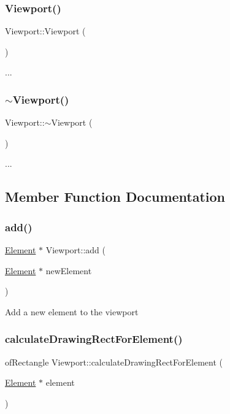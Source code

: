 \subsubsection{\texorpdfstring{Viewport()}{Viewport()}}
{\footnotesize\ttfamily Viewport\+::\+Viewport (\begin{DoxyParamCaption}{ }\end{DoxyParamCaption})}

... \mbox{\label{class_viewport_a1e18a1ff4a52be33ef63d25034561850}} 
\subsubsection{\texorpdfstring{$\sim$\+Viewport()}{~Viewport()}}
{\footnotesize\ttfamily Viewport\+::$\sim$\+Viewport (\begin{DoxyParamCaption}{ }\end{DoxyParamCaption})}

... 

\subsection{Member Function Documentation}
\mbox{\label{class_viewport_a91661e99e68106bb29cf20807c5a167c}} 
\subsubsection{\texorpdfstring{add()}{add()}}
{\footnotesize\ttfamily \hyperlink{class_element}{Element} $\ast$ Viewport\+::add (\begin{DoxyParamCaption}\item[{\hyperlink{class_element}{Element} $\ast$}]{new\+Element }\end{DoxyParamCaption})}

Add a new element to the viewport \mbox{\label{class_viewport_a2b7530dfc9d4df664f3874c8ec17d86e}} 
\subsubsection{\texorpdfstring{calculate\+Drawing\+Rect\+For\+Element()}{calculateDrawingRectForElement()}}
{\footnotesize\ttfamily of\+Rectangle Viewport\+::calculate\+Drawing\+Rect\+For\+Element (\begin{DoxyParamCaption}\item[{\hyperlink{class_element}{Element} $\ast$}]{element }\end{DoxyParamCaption})}

